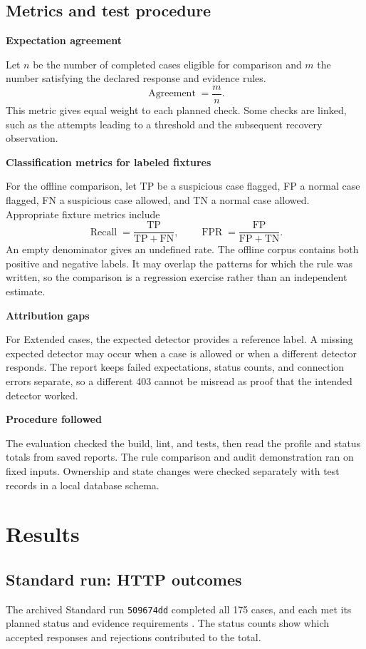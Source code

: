 \documentclass[11pt,a4paper,oneside]{report}
\newcommand{\topic}[1]{\par\addvspace{4pt}\noindent\textbf{#1}\par\nobreak\vspace{-.20em}}
\newcommand{\sheet}[1]{\clearpage\section{#1}}
\begin{document}
\sheet{Metrics and test procedure}
\topic{Expectation agreement}
Let $n$ be the number of completed cases eligible for comparison and $m$ the number satisfying the declared response and evidence rules.
\[
 \operatorname{Agreement} = \frac{m}{n}.
\]
This metric gives equal weight to each planned check. Some checks are linked, such as the attempts leading to a threshold and the subsequent recovery observation.

\topic{Classification metrics for labeled fixtures}
For the offline comparison, let TP be a suspicious case flagged, FP a normal case flagged, FN a suspicious case allowed, and TN a normal case allowed. Appropriate fixture metrics include
\[
 \operatorname{Recall}=\frac{\mathrm{TP}}{\mathrm{TP}+\mathrm{FN}},
 \qquad
 \operatorname{FPR}=\frac{\mathrm{FP}}{\mathrm{FP}+\mathrm{TN}}.
\]
An empty denominator gives an undefined rate. The offline corpus contains both positive and negative labels. It may overlap the patterns for which the rule was written, so the comparison is a regression exercise rather than an independent estimate.

\topic{Attribution gaps}
For Extended cases, the expected detector provides a reference label. A missing expected detector may occur when a case is allowed or when a different detector responds. The report keeps failed expectations, status counts, and connection errors separate, so a different 403 cannot be misread as proof that the intended detector worked.

\topic{Procedure followed}
The evaluation checked the build, lint, and tests, then read the profile and status totals from saved reports. The rule comparison and audit demonstration ran on fixed inputs. Ownership and state changes were checked separately with test records in a local database schema.

\chapter{Results}
\section{Standard run: HTTP outcomes}
The archived Standard run \texttt{509674dd} completed all 175 cases, and each met its planned status and evidence requirements \cite{artifacts}. The status counts show which accepted responses and rejections contributed to the total.
\end{document}
